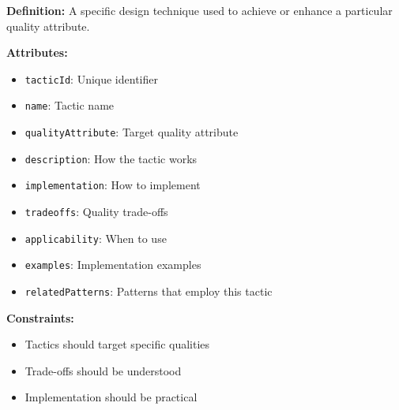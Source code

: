 \documentclass[11pt,letterpaper]{article}
\begin{document}
\begin{definitionbox}
\textbf{Definition:} A specific design technique used to achieve or enhance a particular quality attribute.

\textbf{Attributes:}
\begin{itemize}[nosep]
    \item \texttt{tacticId}: Unique identifier
    \item \texttt{name}: Tactic name
    \item \texttt{qualityAttribute}: Target quality attribute
    \item \texttt{description}: How the tactic works
    \item \texttt{implementation}: How to implement
    \item \texttt{tradeoffs}: Quality trade-offs
    \item \texttt{applicability}: When to use
    \item \texttt{examples}: Implementation examples
    \item \texttt{relatedPatterns}: Patterns that employ this tactic
\end{itemize}

\textbf{Constraints:}
\begin{itemize}[nosep]
    \item Tactics should target specific qualities
    \item Trade-offs should be understood
    \item Implementation should be practical
\end{itemize}
\end{definitionbox}
\end{document}
